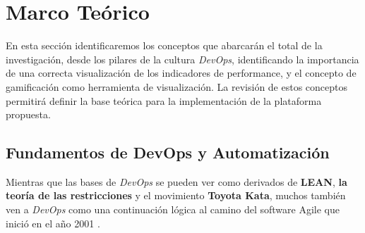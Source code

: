 \documentclass[journal]{IEEEtran}
\begin{document}
\section{\textbf{\Large Marco Teórico}}

En esta sección identificaremos los conceptos que abarcarán el total de la investigación, desde los pilares de la cultura \textit{DevOps}, identificando la importancia de una correcta visualización de los indicadores de performance, y el concepto de gamificación como herramienta de visualización. La revisión de estos conceptos permitirá definir la base teórica para la implementación de la plataforma propuesta.

\subsection{\textbf{Fundamentos de DevOps y Automatización}}

\begin{tcolorbox}[colback=gray!10, colframe=black, left=2mm, right=2mm]
    \small %
    \ttfamily %
    \raggedright %
    Mientras que las bases de \textit{DevOps} se pueden ver como derivados de \textbf{LEAN}, \textbf{la teoría de las restricciones} y el movimiento \textbf{Toyota Kata}, muchos también ven a \textit{DevOps} como una continuación lógica al camino del software Agile que inició en el año 2001 \cite{kim2021devops}.
    \end{tcolorbox}
\end{document}
